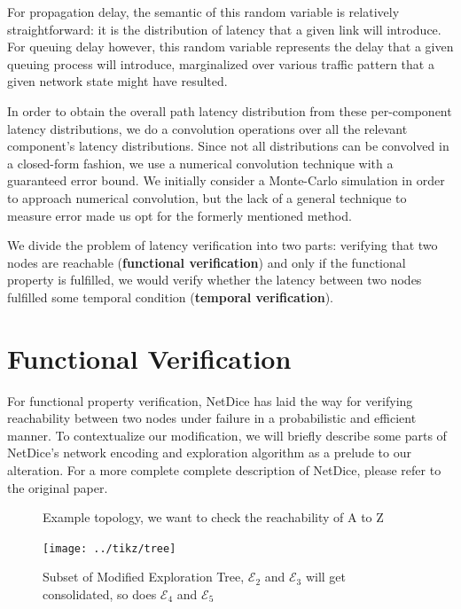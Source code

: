 \documentclass[10pt,sigconf,letterpaper,anonymous,nonacm]{acmart}
\begin{document}
For propagation delay, the semantic of this random variable is relatively straightforward: it is 
the distribution of latency that a given link will introduce.
For queuing delay however, this random variable represents the delay that a given queuing process 
will introduce, marginalized over various traffic pattern that a given network state might have 
resulted.

In order to obtain the overall path latency distribution from these per-component latency 
distributions, we do a convolution operations over all the relevant component's latency 
distributions.
Since not all distributions can be convolved in a closed-form fashion, we use a numerical 
convolution technique with a guaranteed error bound. 
We initially consider a Monte-Carlo simulation in order to approach numerical convolution, but 
the lack of a general technique to measure error made us opt for the formerly mentioned method.


We divide the problem of latency verification into two parts: 
verifying that two nodes are reachable (\textbf{functional verification}) and only if 
the functional property is fulfilled, we would verify whether the latency between 
two nodes fulfilled some temporal condition (\textbf{temporal verification}).

\section{Functional Verification}
For functional property verification, NetDice \cite{steffen2020probabilistic} 
has laid the way for verifying reachability between two nodes under failure in a 
probabilistic and efficient manner.
To contextualize our modification, we will briefly describe some parts of 
NetDice's network encoding and exploration algorithm as a prelude to our alteration.
For a more complete complete description of NetDice, please refer to the original 
paper.

\begin{figure}[h]
    \centering
    
    \caption{Example topology, we want to check the reachability of A to Z}
    \label{fig:ex}
\end{figure}

\begin{figure}[h]
    \centering
    \texttt{[image: ../tikz/tree]}
    \caption{Subset of Modified Exploration Tree, $\mathcal{E}_2$ and $\mathcal{E}_3$ 
        will get consolidated, so does $\mathcal{E}_4$ and $\mathcal{E}_5$}
    \label{fig:tree}
\end{figure}
\end{document}
